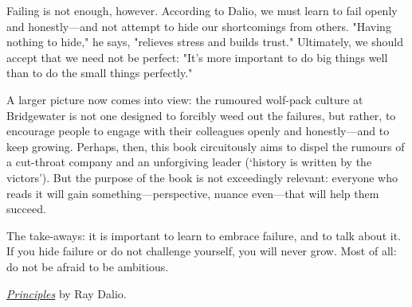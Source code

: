    Failing is not enough, however. According to Dalio, we must learn to
   fail openly and honestly---and not attempt to hide our shortcomings
   from others. "Having nothing to hide," he says, "relieves stress and
   builds trust." Ultimately, we should accept that we need not be
   perfect: "It's more important to do big things well than to do the
   small things perfectly."

   A larger picture now comes into view: the rumoured wolf-pack culture at
   Bridgewater is not one designed to forcibly weed out the failures, but
   rather, to encourage people to engage with their colleagues openly and
   honestly---and to keep growing. Perhaps, then, this book circuitously
   aims to dispel the rumours of a cut-throat company and an unforgiving
   leader (`history is written by the victors'). But the purpose of the
   book is not exceedingly relevant: everyone who reads it will gain
   something---perspective, nuance even---that will help them succeed.

   The take-aways: it is important to learn to embrace failure, and to
   talk about it. If you hide failure or do not challenge yourself, you
   will never grow. Most of all: do not be afraid to be ambitious.

\textit{\href{https://www.goodreads.com/book/show/34536488-principles}{Principles}} by Ray Dalio.

  
